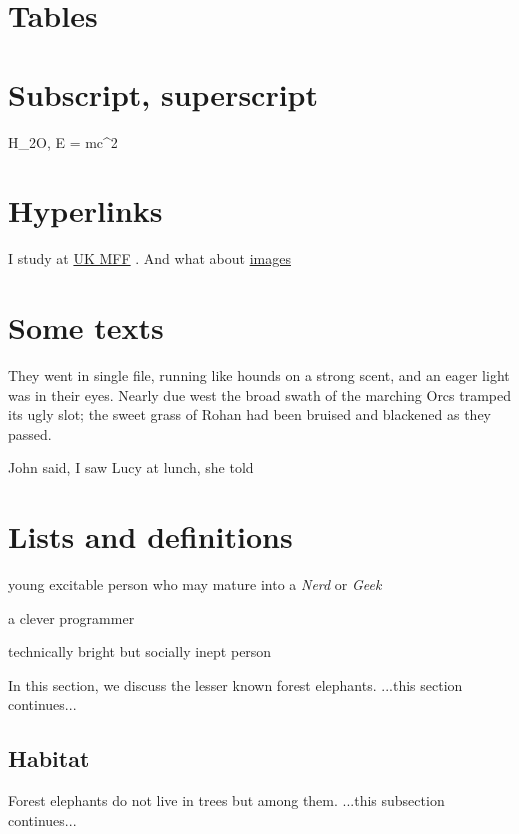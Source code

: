 \documentclass{article}
\begin{document}
\section{Tables}
\section{Subscript, superscript}
\par H_{2}O, E = mc^{2}
\section{Hyperlinks}
\par I study at \href{http://www.mff.cuni.cz}{UK MFF}
. And
    what about \href{#img}{images}

\section{Some texts}
\par \begin{center}They went in single file, running like hounds on a strong scent,
and an eager light was in their eyes. Nearly due west the broad
swath of the marching {\fontsize{4}{5}\selectfont  Orcs tramped} its ugly slot; the sweet grass
of Rohan had been bruised and blackened as they passed.\end{center}
\par John said, I saw Lucy at lunch, she told
\section{Lists and definitions}
\begin{description}[style=unboxed, labelwidth=\linewidth, font =\sffamily\itshape\bfseries, listparindent =0pt, before =\sffamily]\item[Dweeb]young excitable person who may mature
    into a \emph{Nerd} or \emph{Geek}\item[Hacker]a clever programmer\item[Nerd]technically bright but socially inept person\end{description}
\par In this section, we discuss the lesser known forest elephants.
...this section continues...
\subsection{Habitat}
\par Forest elephants do not live in trees but among them.
...this subsection continues... 
\end{document}
